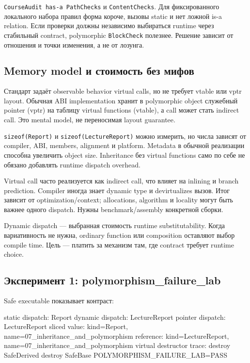 \texttt{CourseAudit has-a PathChecks} и \texttt{ContentChecks}. Для
фиксированного локального набора правил форма короче, вызовы static и нет
ложной is-a relation. Если проверки должны независимо выбираться runtime через
стабильный contract, polymorphic \texttt{BlockCheck} полезнее. Решение зависит
от отношения и точки изменения, а не от лозунга.

\subsection{Memory model и стоимость без мифов}

Стандарт задаёт observable behavior virtual calls, но не требует vtable или
vptr layout. Обычная ABI implementation хранит в polymorphic object
служебный pointer (vptr) на таблицу virtual functions (vtable), а call может
стать indirect call. Это mental model, не переносимая layout guarantee.

\texttt{sizeof(Report)} и \texttt{sizeof(LectureReport)} можно измерить, но
числа зависят от compiler, ABI, members, alignment и platform. Metadata в
обычной реализации способна увеличить object size. Inheritance без virtual
functions само по себе не обязано добавлять runtime dispatch overhead.

\begin{performancebox}
Virtual call часто реализуется как indirect call, что влияет на inlining и
branch prediction. Compiler иногда знает dynamic type и devirtualizes вызов.
Итог зависит от optimization/context; allocations, algorithm и locality могут
быть важнее одного dispatch. Нужны benchmark/assembly конкретной сборки.
\end{performancebox}

Dynamic dispatch --- выбранная стоимость runtime substitutability. Когда
вариативность не нужна, ordinary function или composition оставляют выбор
compile time. Цель --- платить за механизм там, где contract требует runtime
choice.

\subsection{Эксперимент 1: polymorphism\_failure\_lab}

Safe executable показывает контраст:

\begin{outputcode}
static dispatch: Report
dynamic dispatch: LectureReport
pointer dispatch: LectureReport
sliced value: kind=Report, name=07_inheritance_and_polymorphism
reference: kind=LectureReport, name=07_inheritance_and_polymorphism
virtual destructor trace:
destroy SafeDerived
destroy SafeBase
POLYMORPHISM_FAILURE_LAB=PASS
\end{outputcode}

